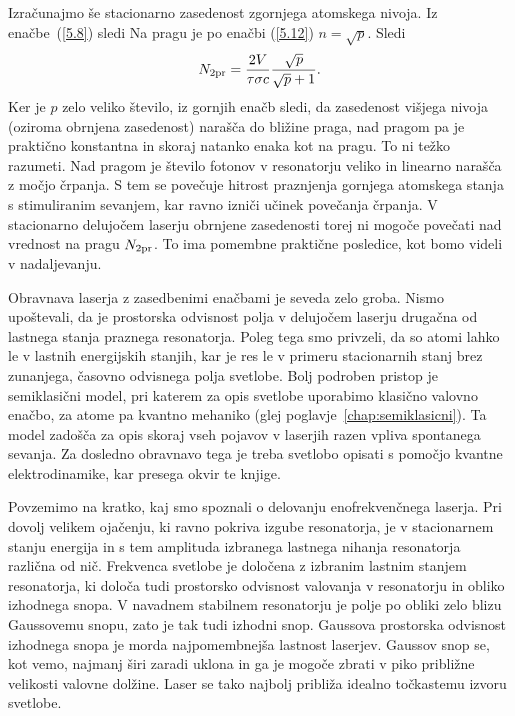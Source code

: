 Izračunajmo še stacionarno zasedenost zgornjega atomskega nivoja. Iz 
enačbe~(\ref{5.8}) sledi
Na pragu je po enačbi (\ref{5.12}) $n=\sqrt{p}$. 
Sledi 
\begin{equation}  
N_{\rm 2pr}=\frac{2V}{\tau \sigma c}\frac{\sqrt{p}}{\sqrt{p}+1}.
\label{5.16}
\end{equation}
Ker je $p$ zelo veliko število, iz gornjih enačb sledi, da zasedenost višjega
nivoja (oziroma obrnjena zasedenost) narašča do bližine praga, nad pragom pa je praktično
konstantna in skoraj natanko enaka kot na pragu. To ni težko razumeti. Nad
pragom je število fotonov v resonatorju veliko in linearno narašča 
z močjo črpanja. S tem se povečuje hitrost praznjenja gornjega atomskega 
stanja s stimuliranim sevanjem, kar ravno izniči učinek povečanja črpanja. 
V stacionarno delujočem laserju obrnjene zasedenosti torej ni mogoče povečati 
nad vrednost na pragu $N_{\rm 2pr}$. To ima pomembne praktične posledice, kot bomo
videli v nadaljevanju.

\begin{remark}
Obravnava laserja z zasedbenimi enačbami je seveda zelo groba. Nismo
upoštevali, da je prostorska odvisnost polja v delujočem laserju 
drugačna od lastnega stanja praznega resonatorja. Poleg tega smo
privzeli, da so atomi lahko le v lastnih energijskih stanjih, kar je res le
v primeru stacionarnih stanj brez zunanjega, časovno odvisnega polja
svetlobe. Bolj podroben pristop je semiklasični model, pri katerem 
za opis svetlobe uporabimo klasično valovno enačbo, za atome
pa kvantno mehaniko (glej poglavje~\ref{chap:semiklasicni}). Ta model
zadošča za opis skoraj vseh pojavov v laserjih razen vpliva spontanega sevanja. 
Za dosledno obravnavo tega je treba svetlobo opisati s pomočjo 
kvantne elektrodinamike, kar presega okvir te knjige.
\end{remark}

Povzemimo na kratko, kaj smo spoznali o delovanju 
enofrekvenčnega laserja. Pri dovolj velikem ojačenju, ki ravno pokriva izgube 
resonatorja, je v stacionarnem stanju energija in s tem amplituda 
izbranega lastnega nihanja resonatorja različna od nič. Frekvenca svetlobe je
določena z izbranim lastnim stanjem resonatorja, ki določa tudi prostorsko
odvisnost valovanja v resonatorju in obliko izhodnega snopa. V navadnem stabilnem 
resonatorju je polje po obliki zelo blizu Gaussovemu snopu, zato je tak tudi izhodni snop.
Gaussova prostorska odvisnost izhodnega snopa je morda najpomembnejša lastnost
laserjev. Gaussov snop se, kot vemo, najmanj širi zaradi uklona in ga je mogoče
zbrati v piko približne velikosti valovne dolžine. Laser se tako najbolj 
približa idealno točkastemu izvoru svetlobe.

